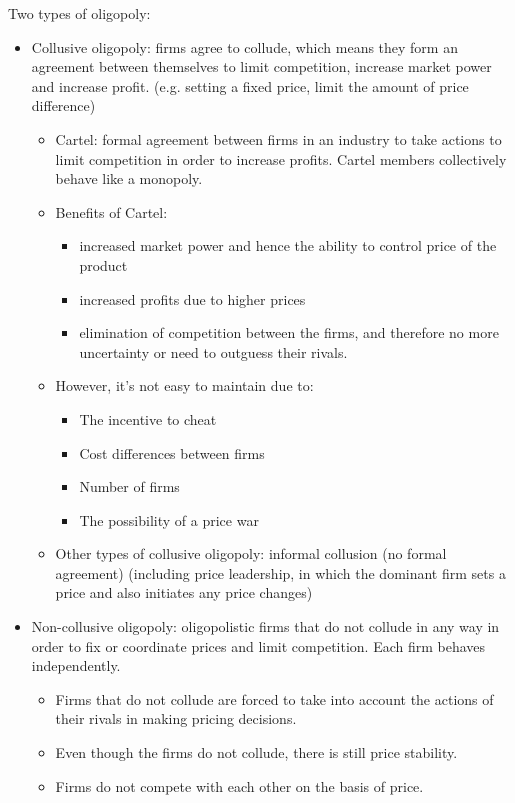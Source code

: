 \documentclass[a4paper,12pt]{article}
\begin{document}
Two types of oligopoly:
\begin{itemize}
  \item Collusive oligopoly: firms agree to collude, which means they form an agreement between themselves to limit competition, increase market power and increase profit. (e.g. setting a fixed price, limit the amount of price difference)
  \begin{itemize}
    \item Cartel: formal agreement between firms in an industry to take actions to limit competition in order to increase profits. Cartel members collectively behave like a monopoly.
    \item Benefits of Cartel:
    \begin{itemize}
      \item increased market power and hence the ability to control price of the product
      \item increased profits due to higher prices
      \item elimination of competition between the firms, and therefore no more uncertainty or need to outguess their rivals.
    \end{itemize}
    \item However, it's not easy to maintain due to:
    \begin{itemize}
      \item The incentive to cheat
      \item Cost differences between firms
      \item Number of firms
      \item The possibility of a price war
    \end{itemize}
    \item Other types of collusive oligopoly: informal collusion (no formal agreement) (including price leadership, in which the dominant firm sets a price and also initiates any price changes)
  \end{itemize}
  \item Non-collusive oligopoly: oligopolistic firms that do not collude in any way in order to fix or coordinate prices and limit competition. Each firm behaves independently.
  \begin{itemize}
    \item Firms that do not collude are forced to take into account the actions of their rivals in making pricing decisions.
    \item Even though the firms do not collude, there is still price stability.
    \item Firms do not compete with each other on the basis of price.
  \end{itemize}
\end{itemize}
\end{document}
